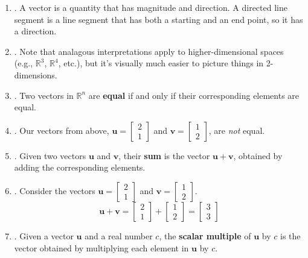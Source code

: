 \documentclass[12pt]{article}
\begin{document}
\begin{enumerate}
\begin{enumerate}
	\item\underline{}.
		A vector is a quantity that has magnitude and direction. A directed line segment is a line segment that has both a starting and an end point, so it has a direction.

	\item\underline{}.
		Note that analagous interpretations apply to higher-dimensional spaces (e.g., $\mathbb{R}^3$, $\mathbb{R}^4$, etc.), but
		it's visually much easier to picture things in 2-dimensions.

	\item\underline{}.
		Two vectors in $\mathbb{R}^n$ are \textbf{equal} if and only if their corresponding elements are equal.

	\item\underline{}.
		Our vectors from above, $\mathbf{u}=\begin{bmatrix}2 \\ 1\end{bmatrix}$ and $\mathbf{v}=\begin{bmatrix}1 \\ 2\end{bmatrix}$,
		are \emph{not} equal.

	\item\underline{}.
		Given two vectors $\mathbf{u}$ and $\mathbf{v}$, their \textbf{sum} is the vector $\mathbf{u}+\mathbf{v}$, obtained
		by adding the corresponding elements.

	\item\underline{}.
		Consider the vectors $\mathbf{u}=\begin{bmatrix}2 \\ 1\end{bmatrix}$ and $\mathbf{v}=\begin{bmatrix}1 \\ 2\end{bmatrix}$.
			\[\mathbf{u}+\mathbf{v}=\begin{bmatrix}2 \\ 1\end{bmatrix}+\begin{bmatrix}1 \\ 2\end{bmatrix}=
				\begin{bmatrix} 3 \\ 3 \end{bmatrix}\]
	
	\item\underline{}.
		Given a vector $\mathbf{u}$ and a real number $c$, the \textbf{scalar multiple} of $\mathbf{u}$ by $c$ is the vector	obtained by multiplying each element in $\mathbf{u}$ by $c$.


\end{enumerate}
\end{enumerate}
\end{document}
